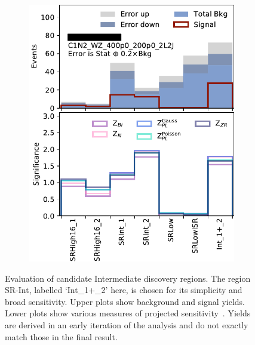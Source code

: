 \begin{figure}[tp]
\begin{subfigure}{0.48\textwidth}
\includegraphics[width=\textwidth]{figures/2ljets_disco_Int_C1N2_WZ_400p0_200p0_2L2J.png}
\caption{}
\end{subfigure}
\caption[
Evaluation of candidate Intermediate discovery regions
]{%
Evaluation of candidate Intermediate discovery regions.
The region SR-Int, labelled `Int\_1+\_2' here, is chosen for its simplicity
and broad sensitivity.
Upper plots show background and signal yields.
Lower plots show various measures of projected
sensitivity~\cite{cousins2008evaluation}.
Yields are derived in an early iteration of the analysis and do not exactly
match those in the final result.
}
\label{fig:2ljets_disco_trials_int}
\end{figure}

